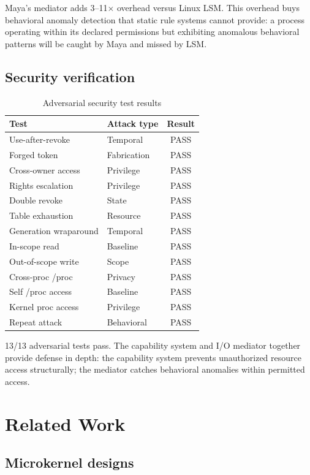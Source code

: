 \documentclass[letterpaper,twocolumn,10pt]{article}
\begin{document}
Maya's mediator adds 3--11$\times$ overhead
versus Linux LSM. This overhead buys behavioral
anomaly detection that static rule systems
cannot provide: a process operating within
its declared permissions but exhibiting
anomalous behavioral patterns will be caught
by Maya and missed by LSM.

\subsection{Security verification}

\begin{table}[h]
\centering
\caption{Adversarial security test results}
\label{tab:security-tests}
\begin{tabular}{llc}
\toprule
Test & Attack type & Result \\
\midrule
Use-after-revoke & Temporal & PASS \\
Forged token & Fabrication & PASS \\
Cross-owner access & Privilege & PASS \\
Rights escalation & Privilege & PASS \\
Double revoke & State & PASS \\
Table exhaustion & Resource & PASS \\
Generation wraparound & Temporal & PASS \\
In-scope read & Baseline & PASS \\
Out-of-scope write & Scope & PASS \\
Cross-proc /proc & Privacy & PASS \\
Self /proc access & Baseline & PASS \\
Kernel proc access & Privilege & PASS \\
Repeat attack & Behavioral & PASS \\
\bottomrule
\end{tabular}
\end{table}

13/13 adversarial tests pass. The capability
system and I/O mediator together provide
defense in depth: the capability system
prevents unauthorized resource access
structurally; the mediator catches behavioral
anomalies within permitted access.

\section{Related Work}

\subsection{Microkernel designs}
\end{document}

